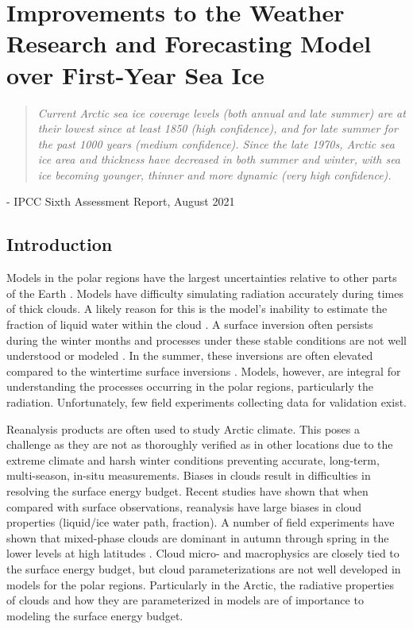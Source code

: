 \chapter{Improvements to the Weather Research and Forecasting Model over First-Year Sea Ice}
\vspace{1 cm}
\begin{spacing}{1} \begin{quote} 
\noindent \emph{Current Arctic sea ice coverage levels (both annual and late summer) are at their lowest since at least 1850 (high confidence), and for late summer for the past 1000 years (medium confidence). Since the late 1970s, Arctic sea ice area and thickness have decreased in both summer and winter, with sea ice becoming younger, thinner and more dynamic (very high confidence).}\end{quote}
\hspace{6 cm} - IPCC Sixth Assessment Report, August 2021  
\end{spacing}
\doublespacing
\section{Introduction}

Models in the polar regions have the largest uncertainties relative to other parts of the Earth \citep{holland:2003, AACI:05}. Models have difficulty simulating radiation accurately during times of thick clouds. A likely reason for this is the model’s inability to estimate the fraction of liquid water within the cloud \citep{graham:2017:comp}. A surface inversion often persists during the winter months and processes under these stable conditions are not well understood or modeled \citep{tastula:2012}. In the summer, these inversions are often elevated compared to the wintertime surface inversions \citep{serreze:1992}. Models, however, are integral for understanding the processes occurring in the polar regions, particularly the radiation. Unfortunately, few field experiments collecting data for validation exist.
 
Reanalysis products are often used to study Arctic climate. This poses a challenge as they are not as thoroughly verified as in other locations due to the extreme climate and harsh winter conditions preventing accurate, long-term, multi-season, in-situ measurements. Biases in clouds result in difficulties in resolving the surface energy budget. Recent studies have shown that when compared with surface observations, reanalysis have large biases in cloud properties (liquid/ice water path, fraction). A number of field experiments have shown that mixed-phase clouds are dominant in autumn through spring in the lower levels at high latitudes \citep{intrieri:2002, wang:2005}. Cloud micro- and macrophysics are closely tied to the surface energy budget, but cloud parameterizations are not well developed in models for the polar regions. Particularly in the Arctic, the radiative properties of clouds and how they are parameterized in models are of importance to modeling the surface energy budget.
 
